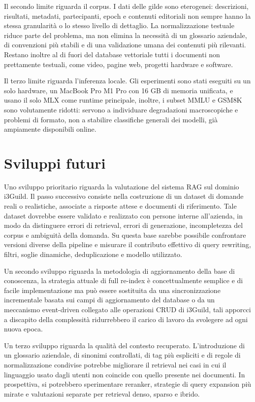 Il secondo limite riguarda il corpus. I dati delle gilde sono eterogenei:
descrizioni, risultati, metadati, partecipanti, epoch e contenuti editoriali non
sempre hanno la stessa granularità o lo stesso livello di dettaglio. La
normalizzazione testuale riduce parte del problema, ma non elimina la necessità
di un glossario aziendale, di convenzioni più stabili e di una validazione
umana dei contenuti più rilevanti. Restano inoltre al di fuori del database
vettoriale tutti i documenti non prettamente testuali, come video, pagine web,
progetti hardware e software.

Il terzo limite riguarda l'inferenza locale. Gli esperimenti sono stati eseguiti
su un solo hardware, un MacBook Pro M1 Pro con 16 GB di memoria unificata, e
usano il solo MLX come runtime principale, inoltre, i subset MMLU e GSM8K sono volutamente ridotti:
servono a individuare degradazioni macroscopiche e problemi di formato, non a
stabilire classifiche generali dei modelli, già ampiamente disponibili online.

\section*{Sviluppi futuri}

Uno sviluppo prioritario riguarda la valutazione del sistema RAG sul dominio
i3Guild. Il passo successivo consiste nella costruzione di un dataset di domande
reali o realistiche, associate a risposte attese e documenti di riferimento.
Tale dataset dovrebbe essere validato e realizzato con persone interne all'azienda, in modo
da distinguere errori di retrieval, errori di generazione, incompletezza del
corpus e ambiguità della domanda. Su questa base sarebbe possibile confrontare
versioni diverse della pipeline e misurare il contributo effettivo di query
rewriting, filtri, soglie dinamiche, deduplicazione e modello utilizzato.

Un secondo sviluppo riguarda la metodologia di aggiornamento della base di conoscenza, la strategia
attuale di full re-index è concettualmente semplice e di facile implementazione ma può
essere sostituita da una sincronizzazione incrementale basata sui campi di
aggiornamento del database o da un meccanismo event-driven collegato alle
operazioni CRUD di i3Guild, tali apporcci a discapito della complessità ridurrebbero
il carico di lavoro da svolegere ad ogni nuova epoca.

Un terzo sviluppo riguarda la qualità del contesto recuperato. L'introduzione
di un glossario aziendale, di sinonimi controllati, di tag più espliciti e di
regole di normalizzazione condivise potrebbe migliorare il retrieval nei casi
in cui il linguaggio usato dagli utenti non coincide con quello presente nei
documenti. In prospettiva, si potrebbero sperimentare reranker, strategie di
query expansion più mirate e valutazioni separate per retrieval denso, sparso e
ibrido.

